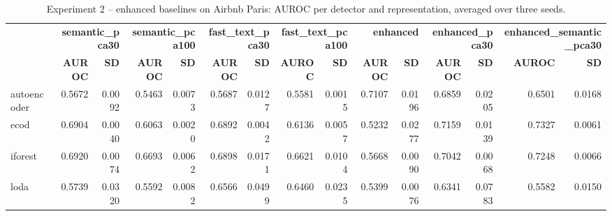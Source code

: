 \begin{table}
\centering
\caption{Experiment 2 -- enhanced baselines on Airbnb Paris: AUROC per detector and representation, averaged over three seeds.}
\label{tab:exp2_auroc_airbnb_paris}
\begin{tabular}{lrrrrrrrrrrrrrr}
\toprule
 & \multicolumn{2}{r}{\bfseries semantic\_pca30} & \multicolumn{2}{r}{\bfseries semantic\_pca100} & \multicolumn{2}{r}{\bfseries fast\_text\_pca30} & \multicolumn{2}{r}{\bfseries fast\_text\_pca100} & \multicolumn{2}{r}{\bfseries enhanced} & \multicolumn{2}{r}{\bfseries enhanced\_pca30} & \multicolumn{2}{r}{\bfseries enhanced\_semantic\_pca30} \\
 & \bfseries AUROC & \bfseries SD & \bfseries AUROC & \bfseries SD & \bfseries AUROC & \bfseries SD & \bfseries AUROC & \bfseries SD & \bfseries AUROC & \bfseries SD & \bfseries AUROC & \bfseries SD & \bfseries AUROC & \bfseries SD \\
\midrule
autoencoder & 0.5672 & 0.0092 & 0.5463 & 0.0073 & 0.5687 & 0.0127 & 0.5581 & 0.0015 & 0.7107 & 0.0196 & 0.6859 & 0.0205 & 0.6501 & 0.0168 \\
ecod & 0.6904 & 0.0040 & 0.6063 & 0.0020 & 0.6892 & 0.0042 & 0.6136 & 0.0057 & 0.5232 & 0.0277 & 0.7159 & 0.0139 & 0.7327 & 0.0061 \\
iforest & 0.6920 & 0.0074 & 0.6693 & 0.0062 & 0.6898 & 0.0171 & 0.6621 & 0.0104 & 0.5668 & 0.0090 & 0.7042 & 0.0068 & 0.7248 & 0.0066 \\
loda & 0.5739 & 0.0320 & 0.5592 & 0.0082 & 0.6566 & 0.0499 & 0.6460 & 0.0235 & 0.5399 & 0.0076 & 0.6341 & 0.0783 & 0.5582 & 0.0150 \\
\bottomrule
\end{tabular}
\end{table}
